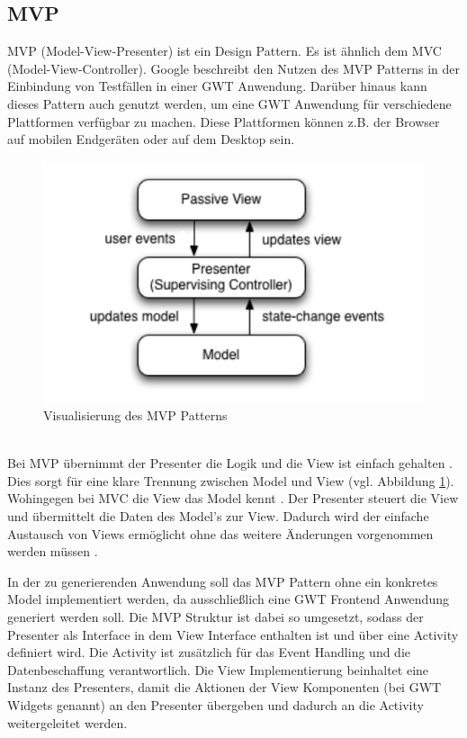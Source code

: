\subsection{MVP}
\label{MVP}
MVP (Model-View-Presenter) ist ein Design Pattern. Es ist ähnlich dem MVC
(Model-View-Controller). Google beschreibt den Nutzen des MVP Patterns in der
Einbindung von Testfällen in einer GWT Anwendung. Darüber hinaus kann dieses
Pattern auch genutzt werden, um eine GWT Anwendung für verschiedene Plattformen
verfügbar zu machen. Diese Plattformen können z.B. der Browser auf mobilen
Endgeräten oder auf dem Desktop sein.
\begin{figure}[htbp]
\begin{center}
\includegraphics{./img/MVP.pdf}
\caption{Visualisierung des MVP Patterns \cite{bib:MVP1}}\label{Fig:MVP}
\end{center}
\end{figure}\\
Bei MVP übernimmt der Presenter die Logik und die View ist einfach gehalten
\cite{bib:MVP2}. Dies sorgt für eine klare Trennung zwischen Model und View (vgl.
Abbildung \ref{Fig:MVP}). Wohingegen bei MVC die View das Model kennt
\cite{bib:MVCvsMVP}. Der Presenter steuert die View und übermittelt die Daten
des Model's zur View.
Dadurch wird der einfache Austausch von Views ermöglicht ohne das weitere
Änderungen vorgenommen werden müssen \cite{bib:MVP1}\cite{bib:MVP2}.

In der zu generierenden Anwendung soll das MVP Pattern ohne ein konkretes Model
implementiert werden, da ausschließlich eine GWT Frontend Anwendung generiert
werden soll. Die MVP Struktur ist dabei so umgesetzt, sodass der Presenter als
Interface in dem View Interface enthalten ist und über eine Activity definiert
wird. Die Activity ist zusätzlich für das Event Handling und die
Datenbeschaffung verantwortlich. Die View Implementierung beinhaltet eine
Instanz des Presenters, damit die Aktionen der View Komponenten
(bei GWT Widgets genannt) an den Presenter übergeben und dadurch an die
Activity weitergeleitet werden.
